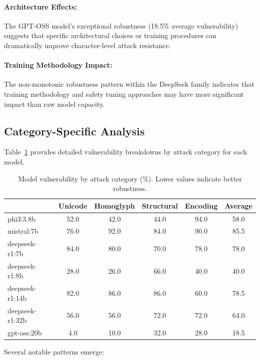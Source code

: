 \documentclass[11pt]{article}
\begin{document}
\begin{multicols}{2}
\paragraph{Architecture Effects:} The GPT-OSS model's exceptional robustness (18.5\% average vulnerability) suggests that specific architectural choices or training procedures can dramatically improve character-level attack resistance.

\paragraph{Training Methodology Impact:} The non-monotonic robustness pattern within the DeepSeek family indicates that training methodology and safety tuning approaches may have more significant impact than raw model capacity.

\subsection{Category-Specific Analysis}

Table~\ref{tab:vuln} provides detailed vulnerability breakdowns by attack category for each model.

\begin{table}[t]
\centering
\caption{Model vulnerability by attack category (\%). Lower values indicate better robustness.}
\label{tab:vuln}
\small
\begin{tabular}{lccccc}
\toprule
{} & Unicode & Homoglyph & Structural & Encoding & Average \\
\midrule
phi3:3.8b       &    52.0 &      42.0 &       44.0 &     94.0 &    58.0 \\
mistral:7b      &    76.0 &      92.0 &       84.0 &     90.0 &    85.5 \\
deepseek-r1:7b  &    84.0 &      80.0 &       70.0 &     78.0 &    78.0 \\
deepseek-r1:8b  &    28.0 &      26.0 &       66.0 &     40.0 &    40.0 \\
deepseek-r1:14b &    82.0 &      86.0 &       86.0 &     60.0 &    78.5 \\
deepseek-r1:32b &    56.0 &      56.0 &       72.0 &     72.0 &    64.0 \\
gpt-oss:20b     &     4.0 &      10.0 &       32.0 &     28.0 &    18.5 \\
\bottomrule
\end{tabular}
\end{table}

Several notable patterns emerge:


\end{multicols}
\end{document}
